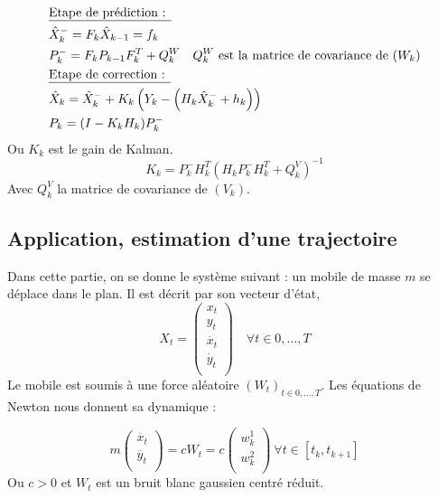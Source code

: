 \documentclass{article}
\begin{document}
\begin{align*}
   &\text{\underline{Etape de prédiction : }}\\
   &\hat{X}_{k}^{-}=F_k\hat{X}_{k-1} =f_{k}\\
   &P_{k}^{-}=F_{k}P_{k-1}F_{k}^{T}+Q_{k}^{W} \quad Q_{k}^{W}\text{ est la matrice de covariance de } (W_{k})\\
   &\text{\underline{Etape de correction : }}\\
   &\hat{X}_{k}= \hat{X}_{k}^{-}+K_{k}\left(Y_{k}-\left(H_{k}\hat{X}_{k}^{-}+h_k\right)\right)\\
   &P_k = (I-K_{k}H_{k})P_{k}^{-}
\end{align*}
Ou $K_k$ est le gain de Kalman. 
\[K_{k}= P_{k}^{-}H_{k}^{T}\left(H_{k}P_{k}^{-}H_{k}^{T}+Q_{k}^{V}\right)^{-1}\]
Avec $Q_{k}^{V}$ la matrice de covariance de $(V_k)$.


\subsection{Application, estimation d'une trajectoire}
Dans cette partie, on se donne le système suivant : un mobile de masse $m$ se déplace dans le plan. Il est décrit par son vecteur d'état, 
\[ X_t = \left (
   \begin{array}{c}
      x_t \\
      y_t \\
      \Dot{x_t} \\
      \Dot{y_t} \\
   \end{array} \right )\quad \forall t \in 0,...,T\]
Le mobile est soumis à une force aléatoire $(W_{t})_{t\in 0,...,T}$. Les équations de Newton nous donnent sa dynamique : 




\[ m \left (
   \begin{array}{c}
      \ddot{x_t} \\
      \ddot{y_t} \\
   \end{array} \right )
   =cW_t =c\left (
   \begin{array}{c}
      w_k^1 \\
      w_k^2 \\
   \end{array} \right )\ 
   \forall t \in [t_k, t_{k+1}]
\] Ou $c>0$ et $W_t$ est un bruit blanc gaussien centré réduit.
\end{document}
